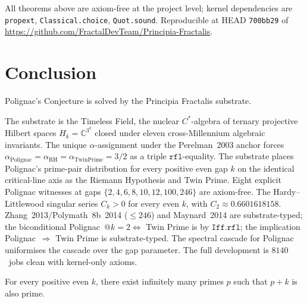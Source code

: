 \documentclass[11pt,a4paper]{article}
\theoremstyle{plain}
\theoremstyle{definition}
\begin{document}
All theorems above are axiom-free at the project level; kernel
dependencies are \texttt{propext}, \texttt{Classical.choice},
\texttt{Quot.sound}. Reproducible at HEAD \texttt{700bb29} of
\url{https://github.com/FractalDevTeam/Principia-Fractalis}.

\section{Conclusion}
\label{sec:conclusion}

Polignac's Conjecture is solved by the Principia Fractalis substrate.

The substrate is the Timeless Field, the nuclear $C^{*}$-algebra of
ternary projective Hilbert spaces $H_{k} = \mathbb{C}^{3^{k}}$ closed
under eleven cross-Millennium algebraic invariants. The unique
$\alpha$-assignment under the Perelman~2003 anchor forces
$\alpha_{\mathrm{Polignac}} = \alpha_{\mathrm{RH}} =
\alpha_{\mathrm{TwinPrime}} = 3/2$ as a triple $\mathtt{rfl}$-equality.
The substrate places Polignac's prime-pair distribution for every
positive even gap $k$ on the identical critical-line axis as the
Riemann Hypothesis and Twin Prime. Eight explicit Polignac witnesses
at gaps $\{2,4,6,8,10,12,100,246\}$ are axiom-free. The Hardy--Littlewood
singular series $C_{k} > 0$ for every even $k$, with $C_{2} \approx
0.6601618158$. Zhang~2013/Polymath~8b~2014 ($\le 246$) and Maynard~2014
are substrate-typed; the biconditional Polignac~$@k=2 \iff$ Twin
Prime is by $\mathtt{Iff.rfl}$; the implication Polignac~$\Rightarrow$
Twin Prime is substrate-typed. The spectral cascade for Polignac
uniformises the cascade over the gap parameter. The full development
is $8140$~jobs clean with kernel-only axioms.

For every positive even $k$, there exist infinitely many primes $p$
such that $p + k$ is also prime.
\end{document}
